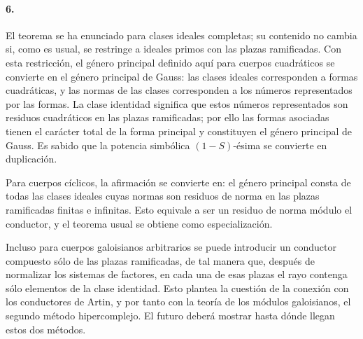 \paragraph{6.}
El teorema se ha enunciado para clases ideales completas; su contenido no cambia si, como es usual, se restringe a ideales primos con las plazas ramificadas. Con esta restricción, el género principal definido aquí para cuerpos cuadráticos se convierte en el género principal de Gauss: las clases ideales corresponden a formas cuadráticas, y las normas de las clases corresponden a los números representados por las formas. La clase identidad significa que estos números representados son residuos cuadráticos en las plazas ramificadas; por ello las formas asociadas tienen el carácter total de la forma principal y constituyen el género principal de Gauss. Es sabido que la potencia simbólica \((1-S)\)-ésima se convierte en duplicación.

Para cuerpos cíclicos, la afirmación se convierte en: el género principal consta de todas las clases ideales cuyas normas son residuos de norma en las plazas ramificadas finitas e infinitas. Esto equivale a ser un residuo de norma módulo el conductor, y el teorema usual se obtiene como especialización.

Incluso para cuerpos galoisianos arbitrarios se puede introducir un conductor compuesto sólo de las plazas ramificadas, de tal manera que, después de normalizar los sistemas de factores, en cada una de esas plazas el rayo contenga sólo elementos de la clase identidad. Esto plantea la cuestión de la conexión con los conductores de Artin, y por tanto con la teoría de los módulos galoisianos, el segundo método hipercomplejo. El futuro deberá mostrar hasta dónde llegan estos dos métodos.